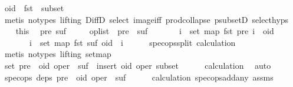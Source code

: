 \begin{isabellebody}
\ {\isachardoublequoteopen}oid\ {\isasymnotin}\ fst\ {\isacharbackquote}\ subset{\isachardoublequoteclose}\isanewline
\ \ \ \ \isamarkupfalse%
\ {\isacharparenleft}metis\ {\isacharparenleft}no{\isacharunderscore}types{\isacharcomma}\ lifting{\isacharparenright}\ DiffD{}\ select\ image{\isacharunderscore}iff\ prod{\isachardot}collapse\ psubsetD\ select{\isachardot}hyps{\isacharparenleft}{}{\isacharparenright}{\isacharparenright}\isanewline
\ \ \isamarkupfalse%
\ this\ \isamarkupfalse%
\ pre\ suf\isanewline
\ \ \ \ \ {\isachardoublequoteopen}op{\isacharunderscore}list\ {\isacharequal}\ pre\ {\isacharat}\ suf{\isachardoublequoteclose}\isanewline
\ \ \ \ \ \ \ {\isachardoublequoteopen}{\isasymforall}i\ {\isasymin}\ set\ {\isacharparenleft}map\ fst\ pre{\isacharparenright}{\isachardot}\ i\ {\isacharless}\ oid{\isachardoublequoteclose}\isanewline
\ \ \ \ \ \ \ {\isachardoublequoteopen}{\isasymforall}i\ {\isasymin}\ set\ {\isacharparenleft}map\ fst\ suf{\isacharparenright}{\isachardot}\ oid\ {\isacharless}\ i{\isachardoublequoteclose}\isanewline
\ \ \ \ \isamarkupfalse%
\ spec{\isacharunderscore}ops{\isacharunderscore}split\ calculation\ \isamarkupfalse%
\ {\isacharparenleft}metis\ {\isacharparenleft}no{\isacharunderscore}types{\isacharcomma}\ lifting{\isacharparenright}\ set{\isacharunderscore}map{\isacharparenright}\isanewline
\ \ \isamarkupfalse%
\ \isamarkupfalse%
\ {\isachardoublequoteopen}set\ {\isacharparenleft}pre\ {\isacharat}\ {\isacharbrackleft}{\isacharparenleft}oid{\isacharcomma}\ oper{\isacharparenright}{\isacharbrackright}\ {\isacharat}\ suf{\isacharparenright}\ {\isacharequal}\ insert\ {\isacharparenleft}oid{\isacharcomma}\ oper{\isacharparenright}\ subset{\isachardoublequoteclose}\isanewline
\ \ \ \ \isamarkupfalse%
\ calculation\ \isamarkupfalse%
\ auto\isanewline
\ \ \isamarkupfalse%
\ \isamarkupfalse%
\ {\isachardoublequoteopen}spec{\isacharunderscore}ops\ deps\ {\isacharparenleft}pre\ {\isacharat}\ {\isacharbrackleft}{\isacharparenleft}oid{\isacharcomma}\ oper{\isacharparenright}{\isacharbrackright}\ {\isacharat}\ suf{\isacharparenright}{\isachardoublequoteclose}\isanewline
\ \ \ \ \isamarkupfalse%
\ calculation\ spec{\isacharunderscore}ops{\isacharunderscore}add{\isacharunderscore}any\ assms{\isacharparenleft}{}{\isacharparenright}\ \isamarkupfalse%

\end{isabellebody}
